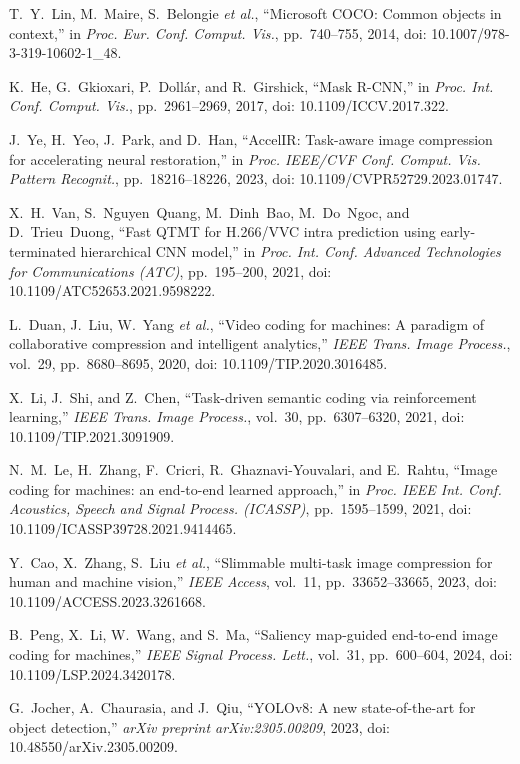 \documentclass[conference]{IEEEtran}
\begin{document}
\begin{thebibliography}{00}
T.~Y.~Lin, M.~Maire, S.~Belongie \textit{et al.}, ``Microsoft COCO: Common objects in context,'' in \textit{Proc. Eur. Conf. Comput. Vis.}, pp.~740--755, 2014, doi: 10.1007/978-3-319-10602-1\_48.

K.~He, G.~Gkioxari, P.~Dollár, and R.~Girshick, ``Mask R-CNN,'' in \textit{Proc. Int. Conf. Comput. Vis.}, pp.~2961--2969, 2017, doi: 10.1109/ICCV.2017.322.

J.~Ye, H.~Yeo, J.~Park, and D.~Han, ``AccelIR: Task-aware image compression for accelerating neural restoration,'' in \textit{Proc. IEEE/CVF Conf. Comput. Vis. Pattern Recognit.}, pp.~18216--18226, 2023, doi: 10.1109/CVPR52729.2023.01747.

X.~H.~Van, S.~Nguyen~Quang, M.~Dinh~Bao, M.~Do~Ngoc, and D.~Trieu~Duong, ``Fast QTMT for H.266/VVC intra prediction using early-terminated hierarchical CNN model,'' in \textit{Proc. Int. Conf. Advanced Technologies for Communications (ATC)}, pp.~195--200, 2021, doi: 10.1109/ATC52653.2021.9598222.

L.~Duan, J.~Liu, W.~Yang \textit{et al.}, ``Video coding for machines: A paradigm of collaborative compression and intelligent analytics,'' \textit{IEEE Trans. Image Process.}, vol.~29, pp.~8680--8695, 2020, doi: 10.1109/TIP.2020.3016485.

X.~Li, J.~Shi, and Z.~Chen, ``Task-driven semantic coding via reinforcement learning,'' \textit{IEEE Trans. Image Process.}, vol.~30, pp.~6307--6320, 2021, doi: 10.1109/TIP.2021.3091909.

N.~M.~Le, H.~Zhang, F.~Cricri, R.~Ghaznavi-Youvalari, and E.~Rahtu, ``Image coding for machines: an end-to-end learned approach,'' in \textit{Proc. IEEE Int. Conf. Acoustics, Speech and Signal Process. (ICASSP)}, pp.~1595--1599, 2021, doi: 10.1109/ICASSP39728.2021.9414465.

Y.~Cao, X.~Zhang, S.~Liu \textit{et al.}, ``Slimmable multi-task image compression for human and machine vision,'' \textit{IEEE Access}, vol.~11, pp.~33652--33665, 2023, doi: 10.1109/ACCESS.2023.3261668.

B.~Peng, X.~Li, W.~Wang, and S.~Ma, ``Saliency map-guided end-to-end image coding for machines,'' \textit{IEEE Signal Process. Lett.}, vol.~31, pp.~600--604, 2024, doi: 10.1109/LSP.2024.3420178.

G.~Jocher, A.~Chaurasia, and J.~Qiu, ``YOLOv8: A new state-of-the-art for object detection,'' \textit{arXiv preprint arXiv:2305.00209}, 2023, doi: 10.48550/arXiv.2305.00209.


\end{thebibliography}
\end{document}

